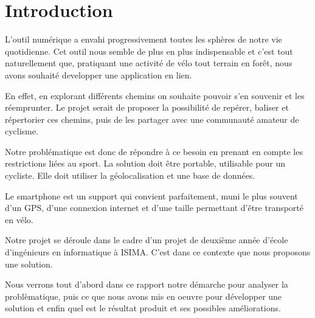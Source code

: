 \section{Introduction}
L'outil numérique a envahi progressivement toutes les sphères de notre vie quotidienne. Cet outil nous semble de
plus en plus indispensable et c'est tout naturellement que, pratiquant une activité de vélo tout terrain en forêt,
nous avons souhaité developper une application en lien.

En effet, en explorant différents chemins on souhaite pouvoir s'en souvenir et les réemprunter. Le projet serait de
proposer la possibilité de repérer, baliser et répertorier ces chemins, puis de les partager avec une communauté
amateur de cyclisme.

Notre problématique est donc de répondre à ce besoin en prenant en compte les restrictions liées au sport. La
solution doit être portable, utilisable pour un cycliste. Elle doit utiliser la géolocalisation et une base de données.

Le smartphone est un support qui convient parfaitement, muni le plus souvent d'un GPS, d'une connexion internet
et d'une taille permettant d'être transporté en vélo.

Notre projet se déroule dans le cadre d'un projet de deuxième année d'école d'ingénieurs en informatique à ISIMA. C'est
dans ce contexte que nous proposons une solution.

Nous verrons tout d'abord dans ce rapport notre démarche pour analyser la problèmatique, puis ce que nous avons mis
en oeuvre pour développer une solution et enfin quel est le résultat produit et ses possibles améliorations.
